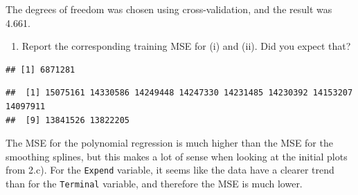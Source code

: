 \documentclass[]{article}
\newenvironment{Shaded}{\begin{snugshade}}{\end{snugshade}}
\newcommand{\CommentTok}[1]{\textcolor[rgb]{0.56,0.35,0.01}{\textit{#1}}}
\newcommand{\DecValTok}[1]{\textcolor[rgb]{0.00,0.00,0.81}{#1}}
\newcommand{\KeywordTok}[1]{\textcolor[rgb]{0.13,0.29,0.53}{\textbf{#1}}}
\newcommand{\NormalTok}[1]{#1}
\newcommand{\OperatorTok}[1]{\textcolor[rgb]{0.81,0.36,0.00}{\textbf{#1}}}
\newcommand{\StringTok}[1]{\textcolor[rgb]{0.31,0.60,0.02}{#1}}
\providecommand{\tightlist}{%
  \setlength{\itemsep}{0pt}\setlength{\parskip}{0pt}}
\begin{document}
\begin{Shaded}
\end{Shaded}

The degrees of freedom was chosen using cross-validation, and the result
was 4.661.

\begin{enumerate}
\def\labelenumi{(\roman{enumi})}
\setcounter{enumi}{2}
\tightlist
\item
  Report the corresponding training MSE for (i) and (ii). Did you expect
  that?
\end{enumerate}

\begin{Shaded}
\end{Shaded}

\begin{verbatim}
## [1] 6871281
\end{verbatim}

\begin{Shaded}
\end{Shaded}

\begin{verbatim}
##  [1] 15075161 14330586 14249448 14247330 14231485 14230392 14153207 14097911
##  [9] 13841526 13822205
\end{verbatim}

The MSE for the polynomial regression is much higher than the MSE for
the smoothing splines, but this makes a lot of sense when looking at the
initial plots from 2.c). For the \texttt{Expend} variable, it seems like
the data have a clearer trend than for the \texttt{Terminal} variable,
and therefore the MSE is much lower.
\end{document}
